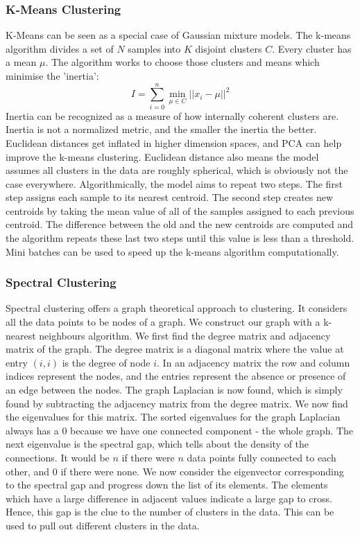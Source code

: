 \documentclass{article}
\begin{document}
\subsubsection{K-Means Clustering}
K-Means can be seen as a special case of Gaussian mixture models. The k-means algorithm divides a set of $N$ samples into $K$ disjoint clusters $C$. Every cluster has a mean $\mu$. The algorithm works to choose those clusters and means which minimise the 'inertia':
$$I = \sum_{i=0}^n \min_{\mu \in C} ||x_i - \mu||^2$$
Inertia can be recognized as a measure of how internally coherent clusters are. Inertia is not a normalized metric, and the smaller the inertia the better. Euclidean distances get inflated in higher dimension spaces, and PCA can help improve the k-means clustering. Euclidean distance also means the model assumes all clusters in the data are roughly spherical, which is obviously not the case everywhere.
Algorithmically, the model aims to repeat two steps. The first step assigns each sample to its nearest centroid. The second step creates new centroids by taking the mean value of all of the samples assigned to each previous centroid. The difference between the old and the new centroids are computed and the algorithm repeats these last two steps until this value is less than a threshold. Mini batches can be used to speed up the k-means algorithm computationally.

\subsubsection{Spectral Clustering}
Spectral clustering offers a graph theoretical approach to clustering. It considers all the data points to be nodes of a graph. We construct our graph with a k-nearest neighbours algorithm. We first find the degree matrix and adjacency matrix of the graph. The degree matrix is a diagonal matrix where the value at entry $(i, i)$ is the degree of node $i$. In an adjacency matrix the row and column indices represent the nodes, and the entries represent the absence or presence of an edge between the nodes. The graph Laplacian is now found, which is simply found by subtracting the adjacency matrix from the degree matrix. We now find the eigenvalues for this matrix. The sorted eigenvalues for the graph Laplacian always has a 0 because we have one connected component - the whole graph. The next eigenvalue is the spectral gap, which tells about the density of the connections. It would be $n$ if there were $n$ data points fully connected to each other, and $0$ if there were none. We now consider the eigenvector corresponding to the spectral gap and progress down the list of its elements. The elements which have a large difference in adjacent values indicate a large gap to cross. Hence, this gap is the clue to the number of clusters in the data. This can be used to pull out different clusters in the data.
\end{document}
